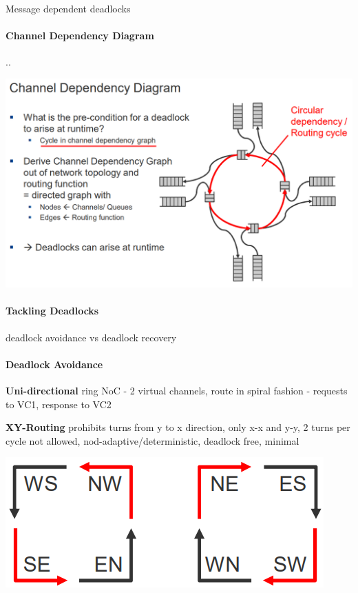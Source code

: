 \documentclass[fontsize=8pt]{scrartcl}
\begin{document}
\begin{multicols*}{4}
Message dependent deadlocks
\paragraph{Channel Dependency Diagram}..

\begin{center}
  \centering
  \includegraphics[width=0.8\linewidth]{img/ChanelDependencyDiagram.png}
  \label{fig:chaneldependencydiagram}
\end{center}

\paragraph{Tackling Deadlocks} \mbox{}

deadlock avoidance vs deadlock recovery

\paragraph{Deadlock Avoidance} \mbox{}

\textbf{Uni-directional} ring NoC - 2 virtual channels, route in spiral fashion - requests to VC1, response to VC2

\textbf{XY-Routing} prohibits turns from y to x direction, only x-x and y-y, 2 turns per cycle not allowed, nod-adaptive/deterministic, deadlock free, minimal


\begin{center}
  \centering
  \includegraphics[width=0.4\linewidth]{img/xy_routing.png}
  \label{fig:xy_routing}
\end{center}


\end{multicols*}
\end{document}
